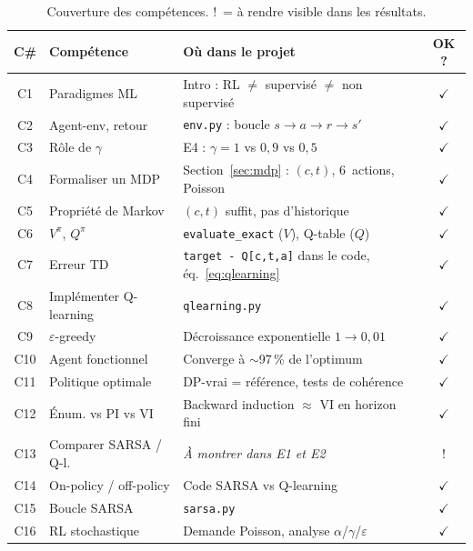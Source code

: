 \documentclass[11pt,a4paper]{article}
\begin{document}
\begin{table}[h]
\centering
\small
\begin{tabular}{@{}clp{7.5cm}c@{}}
\toprule
\textbf{C\#} & \textbf{Compétence} & \textbf{Où dans le projet} & \textbf{OK ?} \\
\midrule
C1 & Paradigmes ML & Intro : RL $\neq$ supervisé $\neq$ non supervisé & $\checkmark$ \\
C2 & Agent-env, retour & \texttt{env.py} : boucle $s \to a \to r \to s'$ & $\checkmark$ \\
C3 & Rôle de $\gamma$ & E4 : $\gamma = 1$ vs $0{,}9$ vs $0{,}5$ & $\checkmark$ \\
C4 & Formaliser un MDP & Section~\ref{sec:mdp} : $(c,t)$, 6~actions, Poisson & $\checkmark$ \\
C5 & Propriété de Markov & $(c,t)$ suffit, pas d'historique & $\checkmark$ \\
C6 & $V^\pi$, $Q^\pi$ & \texttt{evaluate\_exact} ($V$), Q-table ($Q$) & $\checkmark$ \\
C7 & Erreur TD & \texttt{target - Q[c,t,a]} dans le code, éq.~\ref{eq:qlearning} & $\checkmark$ \\
C8 & Implémenter Q-learning & \texttt{qlearning.py} & $\checkmark$ \\
C9 & $\varepsilon$-greedy & Décroissance exponentielle $1 \to 0{,}01$ & $\checkmark$ \\
C10 & Agent fonctionnel & Converge à $\sim$97\,\% de l'optimum & $\checkmark$ \\
C11 & Politique optimale & DP-vrai = référence, tests de cohérence & $\checkmark$ \\
C12 & Énum. vs PI vs VI & Backward induction $\approx$ VI en horizon fini & $\checkmark$ \\
C13 & Comparer SARSA / Q-l. & \textit{À montrer dans E1 et E2} & \textcolor{warnred}{!} \\
C14 & On-policy / off-policy & Code SARSA vs Q-learning & $\checkmark$ \\
C15 & Boucle SARSA & \texttt{sarsa.py} & $\checkmark$ \\
C16 & RL stochastique & Demande Poisson, analyse $\alpha$/$\gamma$/$\varepsilon$ & $\checkmark$ \\
\bottomrule
\end{tabular}
\caption{Couverture des compétences. \textcolor{warnred}{!}~= à rendre visible dans les résultats.}
\end{table}

\newpage
\end{document}
